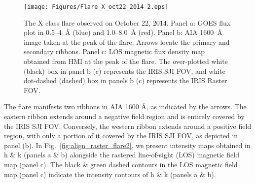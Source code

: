 \begin{figure}[ht!]
    \centering
\hspace*{-.5in}
\texttt{[image: Figures/Flare\_X\_oct22\_2014\_2.eps]}
\caption{The X class flare observed on October 22, 2014. Panel a: GOES flux plot in 0.5{--}4~{\AA} (blue) and 1.0{--}8.0~{\AA} (red). Panel b: AIA 1600~{\AA} image taken at the peak of the flare. Arrows locate the primary and secondary ribbons. Panel c: LOS magnetic flux density map obtained from HMI at the peak of the flare. The over-plotted white (black) box in panel b (c) represents the IRIS SJI FOV, and white dot-dashed (dashed) box in panels b (c) represents the IRIS Raster FOV.}\label{flare2}
\end{figure}

The flare manifests two ribbons in AIA 1600 {\AA}, as indicated by the arrows. The eastern ribbon extends around a negative field region and is entirely covered by the IRIS SJI FOV. Conversely, the western ribbon extends around a positive field region, with only a portion of it covered by the IRIS SJI FOV, as depicted in panel (b). In Fig.~\ref{fig:align_raster_flare2}, we present intensity maps obtained in   h \& k (panels a \& b) alongside the rastered line-of-sight (LOS) magnetic field map (panel c). The black \& green dashed contours in the LOS magnetic field map (panel c) indicate the intensity contours of   h \& k (panels a \& b).

